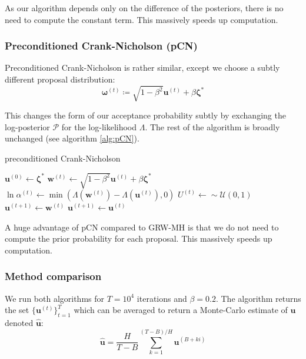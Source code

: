 \documentclass[]{article}
\newcommand{\loglik}{\Lambda}
\newcommand{\ubold}{\boldsymbol{u}}
\newcommand{\wbold}{\boldsymbol{w}}
\newcommand{\zetabold}{\boldsymbol{\zeta^*}}
\newcommand{\omegabold}{\boldsymbol{\omega}}
\newcommand{\Rho}{\mathcal{P}}
\begin{document}
As our algorithm depends only on the difference of the posteriors, there is no need to compute the constant term. This massively speeds up computation.

\subsubsection{Preconditioned Crank-Nicholson (pCN)}

Preconditioned Crank-Nicholson is rather similar, except we choose a subtly different proposal distribution:
%
\begin{equation}
	\omegabold^{(t)} \coloneqq \sqrt{1 - \beta^2} \ubold^{(t)} + \beta \zetabold
\end{equation}

This changes the form of our acceptance probability subtly by exchanging the log-posterior $\Rho$ for the log-likelihood $\loglik$. The rest of the algorithm is broadly unchanged (see algorithm \ref{alg:pCN}).
%
\begin{algorithm}
	\caption{preconditioned Crank-Nicholson}
	\label{alg:pCN}
	\begin{algorithmic}
		\State $\ubold^{(0)} \gets \zetabold$
		\State $\wbold^{(t)} \gets \sqrt{1 - \beta^2} \ubold^{(t)} + \beta \zetabold$ 
		\State $\ln \alpha^{(t)} \gets \min \left(\loglik(\wbold^{(t)}) - \loglik(\ubold^{(t)}), 0\right)$
		\State $U^{(t)} \gets \sim \mathcal{U}(0,1)$ \\
		\State $\ubold^{(t+1)} \gets \wbold^{(t)}$ 
		\Else
		\State $\ubold^{(t+1)} \gets \ubold^{(t)}$ 
		\EndIf
		\EndFor
	\end{algorithmic}
\end{algorithm}

A huge advantage of pCN compared to GRW-MH is that we do not need to compute the prior probability for each proposal. This massively speeds up computation.

\subsubsection{Method comparison}

We run both algorithms for $T=10^4$ iterations and $\beta=0.2$. The algorithm returns the set $\{ \ubold^{(t)} \}_{t=1}^{T}$ which can be averaged to return a Monte-Carlo estimate of $\ubold$ denoted $\hat{\ubold}$:
%
\begin{equation}
	\hat{\ubold} = \frac{H}{T-B} \sum_{k=1}^{(T - B)/H} \ubold^{(B + ki)}
\end{equation}
\end{document}
